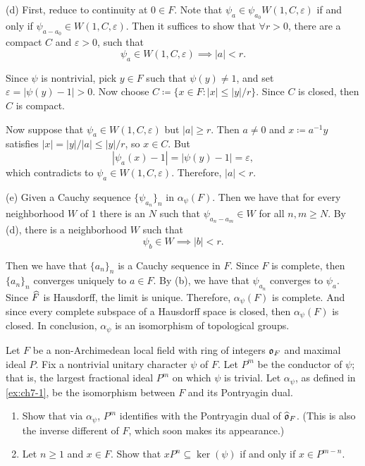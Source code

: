 \begin{solution}
(d) First, reduce to continuity at $0 \in F$. Note that $\psi_a \in \psi_{a_0} W(1, C, \varepsilon)$ if and only if
$\psi_{a - a_0} \in W(1, C, \varepsilon)$. Then it suffices to show that $\forall r > 0$, there are a
compact $C$ and $\varepsilon > 0$, such that
\[\psi_a\in W(1, C, \varepsilon) \implies |a|< r. \]

Since $\psi$ is nontrivial, pick $y \in F$ such that $\psi(y) \neq 1$, and set
$\varepsilon = |\psi(y) - 1| > 0$. Now choose $C \coloneqq \{x \in F: |x| \le |y|/r \}$.
Since $C$ is closed, then $C$ is compact.

Now suppose that $\psi_a \in W(1, C, \varepsilon)$ but $|a| \ge r$. Then $a \neq 0$ and
$x \coloneqq a^{-1} y$ satisfies $|x| = |y|/ |a| \le |y| / r$, so $x \in C$. But
\[|\psi_a(x) - 1| = |\psi(y) - 1| = \varepsilon, \]
which contradicts to $\psi_a\in W(1, C, \varepsilon)$. Therefore, $|a| < r$.

(e) Given a Cauchy sequence $\{\psi_{a_n}\}_n$ in $\alpha_\psi(F)$. Then we have that
for every neighborhood $W$ of $1$ there is an $N$ such that $\psi_{a_n - a_m} \in W$
for all $n, m \ge N$. By (d), there is a neighborhood $W$ such that
\[\psi_b \in W \implies |b| < r. \]

Then we have that $\{a_n\}_n$ is a Cauchy sequence in $F$. Since $F$ is complete,
then $\{a_n\}_n$ converges uniquely to $a \in F$. By (b), we have that $\psi_{a_n}$ converges
to $\psi_a$. Since $\widehat{F}$ is Hausdorff, the limit is unique.
Therefore, $\alpha_{\psi} (F)$ is complete. And since every complete subspace of a Hausdorff space is
closed, then $\alpha_{\psi} (F)$ is closed. In conclusion, $\alpha_\psi$ is an isomorphism
of topological groups.
\end{solution}

\begin{exercise}[2]
  \label{ex:ch7-2}
  Let $F$ be a non-Archimedean local field with ring of integers $\mathfrak{o}_F$
  and maximal ideal $P$. Fix a nontrivial unitary character $\psi$ of $F$.
  Let $P^m$ be the conductor of $\psi$; that is, the largest fractional ideal
  $P^m$ on which $\psi$ is trivial. Let $\alpha_\psi$, as defined in
  \cref{ex:ch7-1}, be the isomorphism between $F$ and its Pontryagin dual.
  \begin{enumerate}[label=(\alph*)]
    \item Show that via $\alpha_\psi$, $P^m$ identifies with the Pontryagin
      dual of $\widehat{\mathfrak{o}}_F$. (This is also the inverse different of $F$,
      which soon makes its appearance.)
    \item Let $n \ge 1$ and $x \in F$. Show that $xP^n \subseteq \ker(\psi)$
      if and only if $x \in P^{m-n}$.
  \end{enumerate}
\end{exercise}

